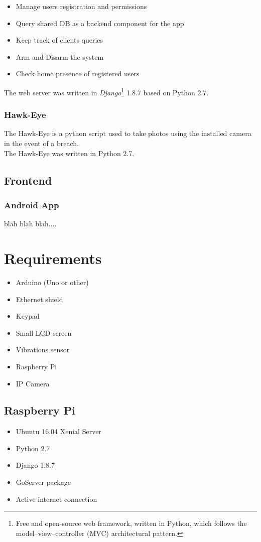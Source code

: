 \documentclass[10pt]{article}
\begin{document}
\begin{itemize}
	\item Manage users registration and permissions
	\item Query shared DB as a backend component for the app
	\item Keep track of clients queries
	\item Arm and Disarm the system
	\item Check home presence of registered users
\end{itemize}
\quad The web server was written in \emph{Django}\footnote{Free and open-source web framework, written in Python, which follows the model–view–controller (MVC) architectural pattern.} 1.8.7 based on Python 2.7.

\quad \subsubsection*{Hawk-Eye}
\quad The Hawk-Eye is a python script used to take photos using the installed camera in the event of a breach. \\
\quad The Hawk-Eye was written in Python 2.7.


\subsection{Frontend}
\subsubsection{Android App}
blah blah blah....

\section{Requirements}
\begin{itemize}
	\item Arduino (Uno or other)
	\item Ethernet shield
	\item Keypad
	\item Small LCD screen
	\item Vibrations sensor
	\item Raspberry Pi
	\item IP Camera
\end{itemize}
\subsection{Raspberry Pi}
\begin{itemize}
	\item Ubuntu 16.04 Xenial Server
	\item Python 2.7	
	\item Django 1.8.7
	\item GoServer package
	\item Active internet connection
\end{itemize}
\end{document}
